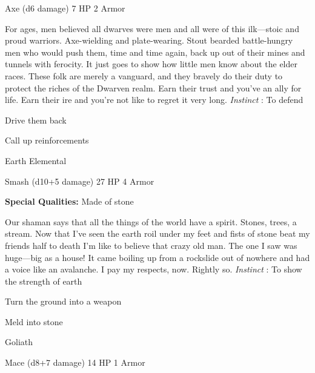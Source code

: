 Axe (d6 damage)	7 HP	2 Armor

 


 
\startMonsterDescription
For ages, men believed all dwarves were men and all were of this ilk—stoic and proud warriors. Axe-wielding and plate-wearing. Stout bearded battle-hungry men who would push them, time and time again, back up out of their mines and tunnels with ferocity. It just goes to show how little men know about the elder races. These folk are merely a vanguard, and they bravely do their duty to protect the riches of the Dwarven realm. Earn their trust and you’ve an ally for life. Earn their ire and you’re not like to regret it very long. {\em Instinct} : To defend
\stopMonsterDescription
 
\startitemize[1,packed]

\item Drive them back

 
\item Call up reinforcements


\stopitemize
 
\startMonsterName
Earth Elemental	 
\stopMonsterName
 

Smash (d10+5 damage)	27 HP	4 Armor

 


 
\startMonsterQualities
{\bf Special Qualities:}  Made of stone
\stopMonsterQualities
 
\startMonsterDescription
Our shaman says that all the things of the world have a spirit. Stones, trees, a stream. Now that I’ve seen the earth roil under my feet and fists of stone beat my friends half to death I’m like to believe that crazy old man. The one I saw was huge—big as a house! It came boiling up from a rockslide out of nowhere and had a voice like an avalanche. I pay my respects, now. Rightly so. {\em Instinct} : To show the strength of earth
\stopMonsterDescription
 
\startitemize[1,packed]

\item Turn the ground into a weapon

 
\item Meld into stone


\stopitemize
 
\startMonsterName
Goliath	 
\stopMonsterName
 

Mace (d8+7 damage)	14 HP	1 Armor

